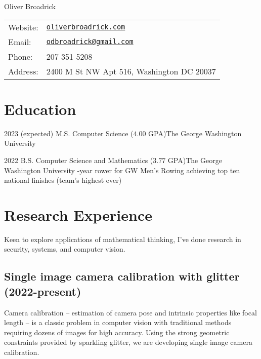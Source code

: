 \documentclass[letterpaper]{article}
\def\name{Oliver Broadrick}
\renewenvironment{itemize}{
  \begin{list}{}{
    \setlength{\leftmargin}{1.5em}
  }
}{
  \end{list}
}
\begin{document}
{\huge \name}

\vspace{0.25in}

\begin{minipage}{0.45\linewidth}
  \begin{tabular}{ll}
    Website: & \href{https://oliverbroadrick.com/}{\tt oliverbroadrick.com} \\
    Email: & \href{mailto:odbroadrick@gmail.com}{\tt odbroadrick@gmail.com} \\
    Phone: & 207 351 5208 \\
    Address: & 2400 M St NW Apt 516, Washington DC 20037
  \end{tabular}
\end{minipage}


\section*{Education}

\begin{itemize}

\item 2023 (expected) M.S. Computer Science ($4.00$ GPA)\hfill The George Washington University
\item 2022 B.S. Computer Science and Mathematics ($3.77$ GPA)\hfill The George Washington University
    -year rower for GW Men's Rowing achieving top ten national finishes (team's highest ever)

\end{itemize}


\section*{Research Experience}

Keen to explore applications of mathematical thinking, I've done research in security, systems, and computer vision. 

\subsection*{Single image camera calibration with glitter (2022-present)}
Camera calibration -- estimation of camera pose and intrinsic properties like focal length -- is a classic problem in computer vision with traditional methods requiring dozens of images for high accuracy. Using the strong geometric constraints provided by sparkling glitter, we are developing single image camera calibration.
\end{document}
